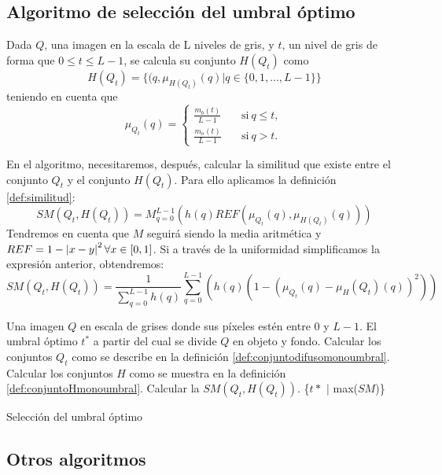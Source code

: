 \subsection{Algoritmo de selección del umbral óptimo}\label{sec:algoritmo3}

\begin{definition}\label{def:conjuntoHmonoumbral}
Dada $Q$, una imagen en la escala de L niveles de gris, y $t$, un nivel de gris de forma que $0\leq t\leq L-1$, se calcula su conjunto $H(Q_t)$ como
$$H(Q_t) = \{(q, \mu_{H(Q_t)}(q)|q\in \{0,1,\dots, L-1\}\}$$ 
teniendo en cuenta que
$$\mu_{Q_t}(q) = \left\{ \begin{aligned}
    \frac{m_b(t)}{L-1} & \quad\text{si}\ q\leq t,\\
    \frac{m_o(t)}{L-1} & \quad\text{si}\ q> t.
 \end{aligned}\right.$$
 \end{definition}

En el algoritmo, necesitaremos, después, calcular la similitud que existe entre el conjunto $Q_t$ y el conjunto $H(Q_t)$. Para ello aplicamos la definición \ref{def:similitud}:
$$SM(Q_t, H(Q_t)) = M^{L-1}_{q=0}(h(q)REF(\mu_{Q_t}(q), \mu_{H(Q_t)}(q)))$$
Tendremos en cuenta que $M$ seguirá siendo la media aritmética y $REF=1-\left\vert x-y\right\vert^2 \forall x\in[0,1]$. Si a través de la uniformidad simplificamos la expresión anterior, obtendremos:
$$SM(Q_t, H(Q_t)) = \frac{1}{\sum_{q=0}^{L-1}h(q)} \sum_{q=0}^{L-1}\left(h(q)(1-(\mu_{Q_t}(q)-\mu_H{(Q_t)}(q))^2)\right)$$

\begin{algorithm}[!ht]
\begin{algorithmic}[1]
\REQUIRE Una imagen $Q$ en escala de grises donde sus píxeles estén entre $0$ y $L-1$.
\ENSURE El umbral óptimo $t^*$ a partir del cual se divide $Q$ en objeto y fondo.
\STATE Calcular los conjuntos $Q_t$ como se describe en la definición \ref{def:conjuntodifusomonoumbral}.
\STATE Calcular los conjuntos $H$ como se muestra en la definición \ref{def:conjuntoHmonoumbral}.
\STATE Calcular la $SM(Q_t, H(Q_t))$.
\ENDFOR
\RETURN \{$t*$ | max($SM$)\}
\end{algorithmic}
\caption{Selección del umbral óptimo}\label{alg:algoritmo3}
\end{algorithm}



\subsection{Otros algoritmos}\label{sec:otrosalgoritmos}
